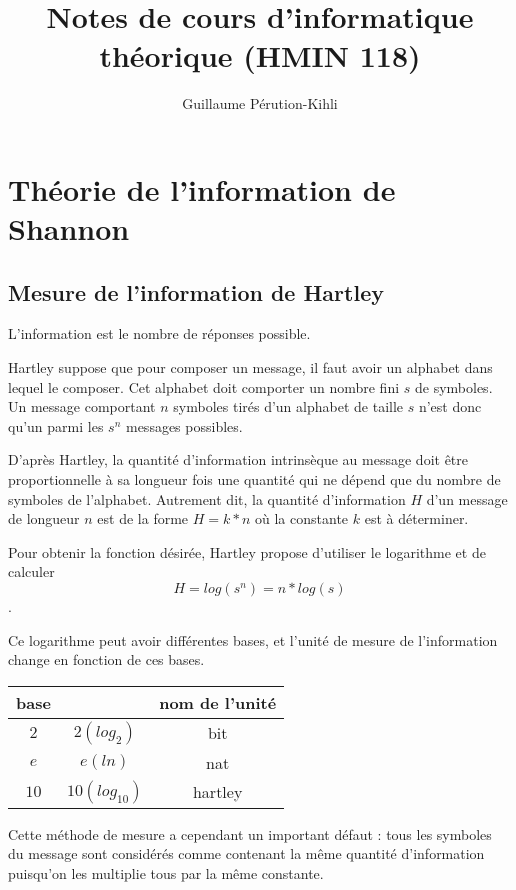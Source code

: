 \documentclass[10pt,a4paper]{article}
\title{Notes de cours d'informatique théorique (HMIN 118)}
\author{Guillaume Pérution-Kihli}
\theoremstyle{definition}
\numberwithin{lemma}{subsection}
\numberwithin{theorem}{subsection}
\numberwithin{definition}{subsection}
\numberwithin{proposition}{subsection}
\numberwithin{corollary}{subsection}
\numberwithin{property}{subsection}
\numberwithin{example}{subsection}
\numberwithin{heuristique}{subsection}
\numberwithin{scenario}{subsection}
\begin{document}
\maketitle
\renewcommand{\contentsname}{Sommaire}
\tableofcontents
\pagebreak

\section{Théorie de l'information de Shannon}
	\subsection{Mesure de l'information de Hartley}
	
L'information est le nombre de réponses possible.
\par Hartley suppose que pour composer un message, il faut avoir un alphabet dans lequel le composer. Cet alphabet doit comporter un nombre fini $s$ de symboles. Un message comportant $n$ symboles tirés d'un alphabet de taille $s$ n'est donc qu'un parmi les $s^n$ messages possibles.
\par D'après Hartley, la quantité d'information intrinsèque au message doit être proportionnelle à sa longueur fois une quantité qui ne dépend que du nombre de symboles de l'alphabet. Autrement dit, la quantité d'information $H$ d'un message de longueur $n$ est de la forme $H = k * n$ où la constante $k$ est à déterminer.
\par Pour obtenir la fonction désirée, Hartley propose d'utiliser le logarithme et de calculer $$H = log(s^n) = n*log(s) $$.
\par Ce logarithme peut avoir différentes bases, et l'unité de mesure de l'information change en fonction de ces bases.
\par
\begin{center}
\begin{tabular}{|c|c|c|}
\hline
base &  & nom de l'unité \\
\hline
$2$ & $2 (log_2)$ & bit \\
\hline
$e$ & $e (ln)$ & nat \\
\hline
$10$ & $10(log_{10})$ & hartley \\
\hline
\end{tabular}
\end{center}

\par Cette méthode de mesure a cependant un important défaut : tous les symboles du message sont considérés comme contenant la même quantité d'information puisqu'on les multiplie tous par la même constante.
\end{document}
